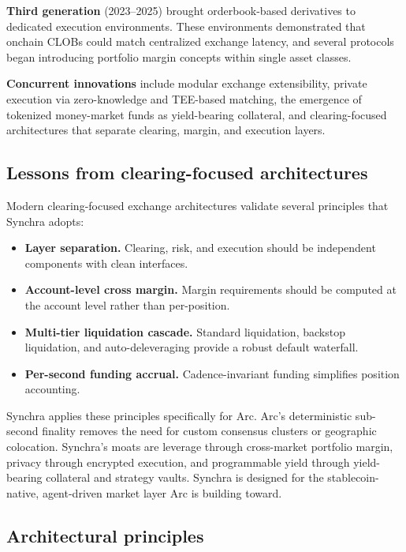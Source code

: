 \documentclass[11pt,a4paper]{article}
\begin{document}
\textbf{Third generation} (2023--2025) brought orderbook-based derivatives to dedicated execution environments. These environments demonstrated that onchain CLOBs could match centralized exchange latency, and several protocols began introducing portfolio margin concepts within single asset classes.

\textbf{Concurrent innovations} include modular exchange extensibility, private execution via zero-knowledge and TEE-based matching, the emergence of tokenized money-market funds as yield-bearing collateral, and clearing-focused architectures that separate clearing, margin, and execution layers.

\subsection{Lessons from clearing-focused architectures}

Modern clearing-focused exchange architectures validate several principles that Synchra adopts:

\begin{itemize}
  \item \textbf{Layer separation.} Clearing, risk, and execution should be independent components with clean interfaces.
  \item \textbf{Account-level cross margin.} Margin requirements should be computed at the account level rather than per-position.
  \item \textbf{Multi-tier liquidation cascade.} Standard liquidation, backstop liquidation, and auto-deleveraging provide a robust default waterfall.
  \item \textbf{Per-second funding accrual.} Cadence-invariant funding simplifies position accounting.
\end{itemize}

Synchra applies these principles specifically for Arc. Arc's deterministic sub-second finality removes the need for custom consensus clusters or geographic colocation. Synchra's moats are leverage through cross-market portfolio margin, privacy through encrypted execution, and programmable yield through yield-bearing collateral and strategy vaults. Synchra is designed for the stablecoin-native, agent-driven market layer Arc is building toward.

\subsection{Architectural principles}
\end{document}
